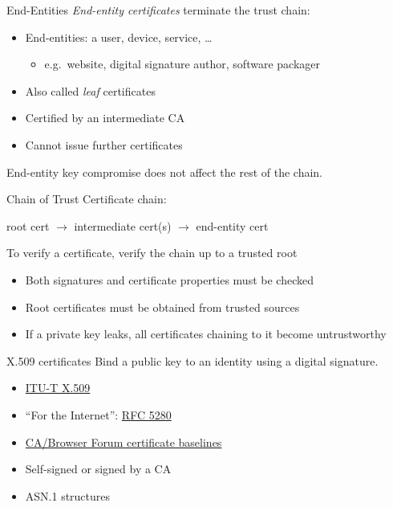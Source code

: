 \begin{frame}{End-Entities}
  \emph{End-entity certificates} terminate the trust chain:
  \begin{itemize}[<+(1)->]
    \item End-entities: a user, device, service, \dots
    \par
    \begin{itemize}
      \item e.g.\ website, digital signature author, software packager
    \end{itemize}
    \item Also called \emph{leaf} certificates
    \item Certified by an intermediate CA
    \item Cannot issue further certificates
  \end{itemize}

  \vspace*{1em}

  \pause
  End-entity key compromise does not affect the rest of the chain.
\end{frame}

\begin{frame}{Chain of Trust}
  Certificate chain:
  \begin{center}
    root cert $\to$ intermediate cert(s) $\to$ end-entity cert
  \end{center}

  \vspace*{1em}

  \pause
  To verify a certificate, verify the chain up to a trusted root
  \begin{itemize}[<+(1)->]
    \item Both signatures and certificate properties must be checked
    \item Root certificates must be obtained from trusted sources
    \item If a private key leaks, all certificates chaining to it become untrustworthy
  \end{itemize}
\end{frame}

\begin{frame}{X.509 certificates}
  \pause
  Bind a public key to an identity using a digital signature.
  \begin{itemize}[<+(1)->]
    \item \href{https://www.itu.int/rec/T-REC-X.509}{ITU-T X.509}
    \item \enquote{For the Internet}: \href{https://datatracker.ietf.org/doc/html/rfc5280}{RFC 5280}
    \item \href{https://cabforum.org}{CA/Browser Forum certificate baselines}
    \item Self-signed or signed by a CA
    \item ASN.1 structures
  \end{itemize}
\end{frame}

